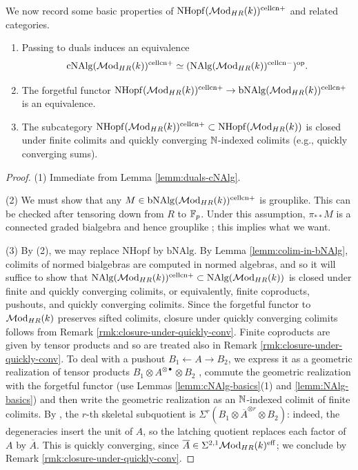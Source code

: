 \documentclass{amsart}
\renewcommand{\NB}[1]{}
\numberwithin{proposition}{section}
\numberwithin{equation}{section}
\def\cell{\mathrm{cell}}
\def\NHopf{\mathrm{NHopf}}
\def\cNAlg{\mathrm{cNAlg}}
\def\bNAlg{\mathrm{bNAlg}}
\def\cn{\mathrm{cn}}
\begin{document}
We now record some basic properties of $\NHopf(\Mod_{HR}(k))^{\cell\cn+}$ and related categories.
\begin{proposition} \label{prop:NHopf-basics}
\begin{enumerate}
\item Passing to duals induces an equivalence \[ \cNAlg(\Mod_{HR}(k))^{\cell\cn+} \wequi (\NAlg(\Mod_{HR}(k))^{\cell\cn-})^\op. \]
\item The forgetful functor $\NHopf(\Mod_{HR}(k))^{\cell\cn+} \to \bNAlg(\Mod_{HR}(k))^{\cell\cn+}$ is an equivalence.
\item The subcategory $\NHopf(\Mod_{HR}(k))^{\cell\cn+} \subset \NHopf(\Mod_{HR}(k))$ is closed under finite colimits and quickly converging $\mathbb{N}$-indexed colimits (e.g., quickly converging sums).
\end{enumerate}
\end{proposition}
\begin{proof}
(1) Immediate from Lemma \ref{lemm:duals-cNAlg}.

(2) We must show that any $M \in \bNAlg(\Mod_{HR}(k))^{\cell\cn+}$ is grouplike.
This can be checked after tensoring down from $R$ to $\mathbb{F}_p$\NB{details?}.
Under this assumption, $\pi_{**}M$ is a connected graded bialgebra and hence grouplike \cite[Proposition 8.2]{milnor-moore}; this implies what we want.

(3) By (2), we may replace $\NHopf$ by $\bNAlg$.
By Lemma \ref{lemm:colim-in-bNAlg}, colimits of normed bialgebras are computed in normed algebras, and so it will suffice to show that $\NAlg(\Mod_{HR}(k))^{\cell\cn+} \subset \NAlg(\Mod_{HR}(k))$ is closed under finite and quickly converging colimits, or equivalently, finite coproducts, pushouts, and quickly converging colimits.
Since the forgetful functor to $\mathcal{M}\mathrm{od}_{HR}(k)$ preserves sifted colimits, closure under quickly converging colimits follows from Remark \ref{rmk:closure-under-quickly-conv}.
Finite coproducts are given by tensor products and so are treated also in Remark \ref{rmk:closure-under-quickly-conv}.
To deal with a pushout $B_1 \leftarrow A \to B_2$, we express it as a geometric realization of tensor products $B_1 \otimes A^{\otimes \bullet} \otimes B_2$ \cite[Theorem~4.4.2.8]{lurie-ha}, commute the geometric realization with the forgetful functor (use Lemmas \ref{lemm:cNAlg-basics}(1) and \ref{lemm:NAlg-basics}) and then write the geometric realization as an $\mathbb{N}$-indexed colimit of finite colimits.
By \cite[Remark~1.2.4.3]{lurie-ha}, the $r$-th skeletal subquotient is $\Sigma^r(B_1 \otimes \overline{A}^{\otimes r} \otimes B_2)$: indeed, the degeneracies insert the unit of $A$, so the latching quotient replaces each factor of $A$ by $\overline{A}$.
This is quickly converging, since $\overline{A} \in \Sigma^{2,1}\mathcal{M}\mathrm{od}_{HR}(k)^{\mathrm{eff}}$; we conclude by Remark \ref{rmk:closure-under-quickly-conv}.
\end{proof}
\end{document}
